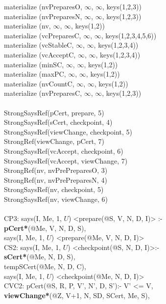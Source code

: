 \begin{code}
\> materialize (nvPreparesO, $\infty$, $\infty$, keys(1,2,3))\\
\> materialize (nvPreparesN, $\infty$, $\infty$, keys(1,2,3))\\
\> materialize (nv, $\infty$, $\infty$, keys(1,2))\\
\> materialize (vcPreparesC, $\infty$, $\infty$, keys(1,2,3,4,5,6))\\
\> materialize (vcStableC, $\infty$, $\infty$, keys(1,2,3,4))\\
\> materialize (vcAcceptC, $\infty$, $\infty$, keys(1,2,3,4))\\
\> materialize (minSC, $\infty$, $\infty$, keys(1,2))\\
\> materialize (maxPC, $\infty$, $\infty$, keys(1,2))\\
\> materialize (nvCountC, $\infty$, $\infty$, keys(1,2))\\
\> materialize (nvPreparesC, $\infty$, $\infty$, keys(1,2,3))\\
\\
StrongSaysRef(pCert, prepare, 5)\\
StrongSaysRef(sCert, checkpoint, 4)\\
StrongSaysRef(viewChange, checkpoint, 5)\\
StrongRef(viewChange, pCert, 7)\\
StrongSaysRef(vcAccept, checkpoint, 6)\\
StrongSaysRef(vcAccept, viewChange, 7)\\
StrongRef(nv, nvPrePreparesO, 3)\\
StrongRef(nv, nvPrePreparesN, 4)\\
StrongSaysRef(nv, checkpoint, 5)\\
StrongSaysRef(nv, viewChange, 6)\\
\\
CP3: says(I, Me, 1, $U$) <prepare(@S, V, N, D, I)> :- \\
\> \textbf{pCert*}(@Me, V, N, D, S), \\
\> says(I, Me, 1, $U$) <prepare(@Me, V, N, D, I)>\\
CS2: says(I, Me, 1, $U$) <checkpoint(@S, N, D, I)>:-\\
\> \textbf{sCert*}(@Me, N, D, S),\\
\> tempSCert(@Me, N, D, C),\\
\> says(I, Me, 1, $U$) <checkpoint(@Me, N, D, I)>\\
CVC2: pCert(@S, R, P, V', N', D, S'):- V' <= V, \\
\> \textbf{viewChange*}(@Z, V+1, N, SD, SCert, Me, S),\\

\end{code}
